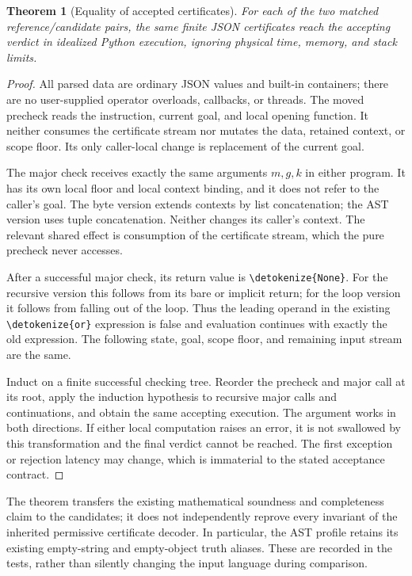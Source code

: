 \documentclass[11pt,letterpaper]{article}
\newtheorem{theorem}{Theorem}[section]
\theoremstyle{definition}
\theoremstyle{remark}
\newcommand{\file}[1]{\expandafter\nolinkurl\expandafter{\detokenize{#1}}}
\begin{document}
\begin{theorem}[Equality of accepted certificates]
For each of the two matched reference/candidate pairs, the same finite
JSON certificates reach the accepting verdict in idealized Python
execution, ignoring physical time, memory, and stack limits.
\end{theorem}
\begin{proof}
All parsed data are ordinary JSON values and built-in containers; there
are no user-supplied operator overloads, callbacks, or threads. The moved
precheck reads the instruction, current goal, and local opening function.
It neither consumes the certificate stream nor mutates the data, retained
context, or scope floor. Its only caller-local change is replacement of
the current goal.

The major check receives exactly the same arguments $m,g,k$ in either
program. It has its own local floor and local context binding, and it
does not refer to the caller's goal. The byte version extends contexts
by list concatenation; the AST version uses tuple concatenation. Neither
changes its caller's context. The relevant shared effect is consumption
of the certificate stream, which the pure precheck never accesses.

After a successful major check, its return value is \file{None}. For the
recursive version this follows from its bare or implicit return; for the
loop version it follows from falling out of the loop. Thus the leading
operand in the existing \file{or} expression is false and evaluation
continues with exactly the old expression. The following state, goal,
scope floor, and remaining input stream are the same.

Induct on a finite successful checking tree. Reorder the precheck and
major call at its root, apply the induction hypothesis to recursive major
calls and continuations, and obtain the same accepting execution. The
argument works in both directions. If either local computation raises
an error, it is not swallowed by this transformation and the final verdict
cannot be reached. The first exception or rejection latency may change,
which is immaterial to the stated acceptance contract.
\end{proof}

The theorem transfers the existing mathematical soundness and completeness
claim to the candidates; it does not independently reprove every invariant
of the inherited permissive certificate decoder. In particular, the AST
profile retains its existing empty-string and empty-object truth aliases.
These are recorded in the tests, rather than silently changing the input
language during comparison.
\end{document}

